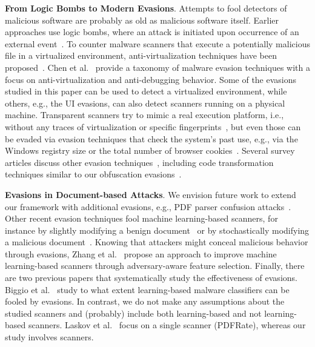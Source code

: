 \textbf{From Logic Bombs to Modern Evasions}.
Attempts to fool detectors of malicious software are probably as old as malicious software itself.
Earlier approaches use logic bombs, where an attack is initiated upon occurrence of an external event~\cite{greenberg1998mobile, avivzienis2004dependability}.
To counter malware scanners that execute a potentially malicious file in a virtualized environment, anti-virtualization techniques have been proposed~\cite{raffetseder2007detecting}.
Chen et al.~\cite{chen2008towards} provide a taxonomy of malware evasion techniques with a focus on anti-virtualization and anti-debugging behavior.
Some of the evasions studied in this paper can be used to detect a virtualized environment, while others, e.g., the UI evasions, can also detect scanners running on a physical machine.
Transparent scanners try to mimic a real execution platform, i.e., without any traces of virtualization or specific fingerprints~\cite{kirat2014barecloud}, but even those can be evaded via evasion techniques that check the system's past use, e.g., via the Windows registry size or the total number of browser cookies~\cite{miramirkhani2017spotless}.
Several survey articles discuss other evasion techniques~\cite{corona2013adversarial,bulazel2017survey}, including code transformation techniques similar to our obfuscation evasions~\cite{you2010malware}.

\textbf{Evasions in Document-based Attacks}.
We envision future work to extend our framework with additional evasions, e.g., PDF parser confusion attacks~\cite{carmony2016extract}.
Other recent evasion techniques fool machine learning-based scanners, for instance by slightly modifying a benign document~\cite{Maiorca2013} or by stochastically modifying a malicious document~\cite{xu2016automatically,Dang2017}.
Knowing that attackers might conceal malicious behavior through evasions, Zhang et al.~\cite{zhang2016adversarial} propose an approach to improve machine learning-based scanners through adversary-aware feature selection.
Finally, there are two previous papers that systematically study the effectiveness of evasions.
Biggio et al.~\cite{biggio2013evasion} study to what extent learning-based malware classifiers can be fooled by evasions.
In contrast, we do not make any assumptions about the studied scanners and (probably) include both learning-based and not learning-based scanners.
Laskov et al.~\cite{laskov2014practical} focus on a single scanner (PDFRate), whereas our study involves \nbAnalyzers{} scanners.

